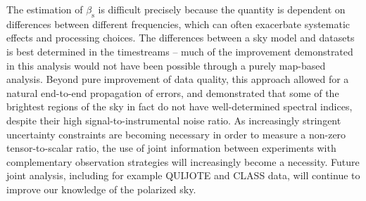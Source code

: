 \documentclass[twocolumn]{../../common/aa}
\def\WMAPnine{\emph{WMAP9}}
\def\Planck{\emph{Planck}}
\newcommand{\cosmoglobe}{\textsc{Cosmoglobe}}
\newcommand{\Cosmoglobe}{\textsc{Cosmoglobe}}
\newcommand{\K}[0]{\textit K}
\begin{document}
The estimation of $\beta_\mathrm s$ is difficult precisely because the quantity is dependent on differences between different frequencies, which can often exacerbate systematic effects and processing choices. The differences between a sky model and datasets is best determined in the timestreams -- much of the improvement demonstrated in this analysis would not have been possible through a purely map-based analysis. Beyond pure improvement of data quality, this approach allowed for a natural end-to-end propagation of errors, and demonstrated that some of the brightest regions of the sky in fact do not have well-determined spectral indices, despite their high signal-to-instrumental noise ratio. As increasingly stringent uncertainty constraints are becoming necessary in order to measure a non-zero tensor-to-scalar ratio, the use of joint information between experiments with complementary observation strategies will increasingly become a necessity. Future joint analysis, including for example QUIJOTE and CLASS data, will continue to improve our knowledge of the polarized sky.














\end{document}
